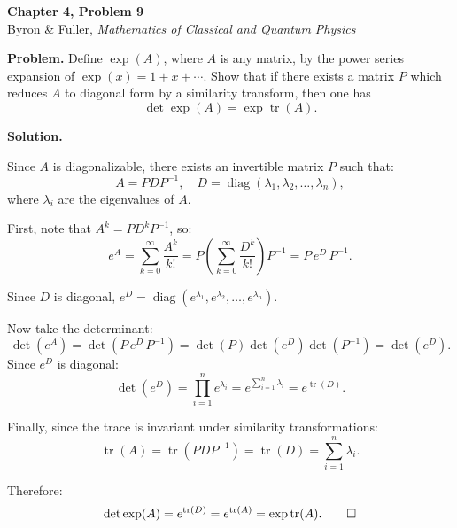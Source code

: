 \documentclass[12pt]{article}
\begin{document}
\begin{center}
{\Large\bfseries Chapter 4, Problem 9}\\[6pt]
Byron \& Fuller, \textit{Mathematics of Classical and Quantum Physics}
\end{center}

\bigskip

\textbf{Problem.} Define $\exp(A)$, where $A$ is any matrix, by the power series expansion of $\exp(x) = 1 + x + \cdots$. Show that if there exists a matrix $P$ which reduces $A$ to diagonal form by a similarity transform, then one has
\[
\det\exp(A) = \exp\operatorname{tr}(A).
\]

\bigskip
\textbf{Solution.}

Since $A$ is diagonalizable, there exists an invertible matrix $P$ such that:
\[
A = P D P^{-1}, \quad D = \operatorname{diag}(\lambda_1, \lambda_2, \ldots, \lambda_n),
\]
where $\lambda_i$ are the eigenvalues of $A$.

First, note that $A^k = P D^k P^{-1}$, so:
\[
e^A = \sum_{k=0}^{\infty} \frac{A^k}{k!} = P\left(\sum_{k=0}^{\infty} \frac{D^k}{k!}\right)P^{-1} = P\, e^D\, P^{-1}.
\]

Since $D$ is diagonal, $e^D = \operatorname{diag}(e^{\lambda_1}, e^{\lambda_2}, \ldots, e^{\lambda_n})$.

Now take the determinant:
\[
\det(e^A) = \det(P\, e^D\, P^{-1}) = \det(P)\det(e^D)\det(P^{-1}) = \det(e^D).
\]
Since $e^D$ is diagonal:
\[
\det(e^D) = \prod_{i=1}^n e^{\lambda_i} = e^{\sum_{i=1}^n \lambda_i} = e^{\operatorname{tr}(D)}.
\]

Finally, since the trace is invariant under similarity transformations:
\[
\operatorname{tr}(A) = \operatorname{tr}(P D P^{-1}) = \operatorname{tr}(D) = \sum_{i=1}^n \lambda_i.
\]

Therefore:
\[
\det\exp(A) = e^{\operatorname{tr}(D)} = e^{\operatorname{tr}(A)} = \exp\operatorname{tr}(A). \qed
\]
\end{document}
